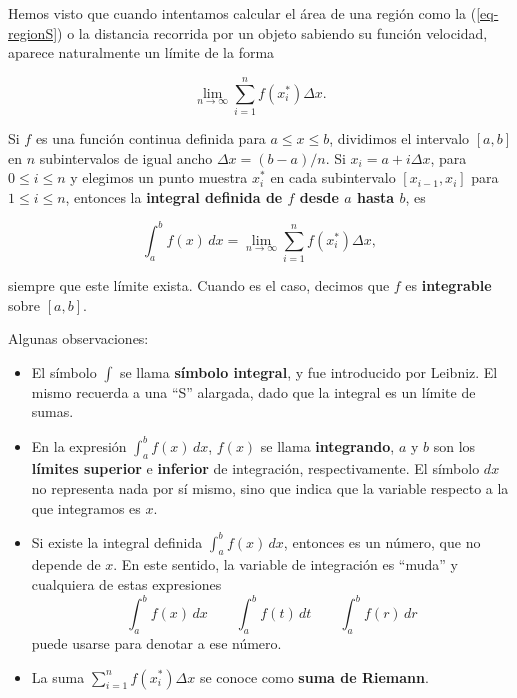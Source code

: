 \documentclass[
  letterpaper,
]{book}
\theoremstyle{plain}
\theoremstyle{remark}
\begin{document}
Hemos visto que cuando intentamos calcular el área de una región como la
(\ref{eq-regionS}) o la distancia recorrida por un objeto sabiendo su
función velocidad, aparece naturalmente un límite de la forma

\[
\lim_{n\to \infty} \sum_{i=1}^{n} f(x_i^*)\Delta x.
\]

\begin{tcolorbox}[enhanced jigsaw, opacityback=0, left=2mm, opacitybacktitle=0.6, toprule=.15mm, bottomrule=.15mm, colbacktitle=quarto-callout-note-color!10!white, titlerule=0mm, bottomtitle=1mm, title=\textcolor{quarto-callout-note-color}{\faInfo}\hspace{0.5em}{Definición (Integral definida)}, toptitle=1mm, colframe=quarto-callout-note-color-frame, colback=white, breakable, rightrule=.15mm, arc=.35mm, leftrule=.75mm, coltitle=black]

Si \(f\) es una función continua definida para \(a\leq x\leq b\),
dividimos el intervalo \([a,b]\) en \(n\) subintervalos de igual ancho
\(\Delta x=(b-a)/n\). Si \(x_i=a+i\Delta x\), para \(0\leq i\leq n\) y
elegimos un punto muestra \(x_i^*\) en cada subintervalo
\([x_{i-1},x_i]\) para \(1\leq i\leq n\), entonces la \textbf{integral
definida de \(f\) desde \(a\) hasta \(b\)}, es

\[
\int_a^b f(x)\,dx=\lim_{n\to \infty} \sum_{i=1}^n f(x_i^*)\Delta x,
\]

siempre que este límite exista. Cuando es el caso, decimos que \(f\) es
\textbf{integrable} sobre \([a,b]\).

\end{tcolorbox}

Algunas observaciones:

\begin{itemize}
\item
  El símbolo \(\int\) se llama \textbf{símbolo integral}, y fue
  introducido por Leibniz. El mismo recuerda a una ``S'' alargada, dado
  que la integral es un límite de sumas.
\item
  En la expresión \(\displaystyle \int_a^b f(x)\,dx\), \(f(x)\) se llama
  \textbf{integrando}, \(a\) y \(b\) son los \textbf{límites superior} e
  \textbf{inferior} de integración, respectivamente. El símbolo \(dx\)
  no representa nada por sí mismo, sino que indica que la variable
  respecto a la que integramos es \(x\).
\item
  Si existe la integral definida \(\displaystyle \int_a^b f(x)\,dx\),
  entonces es un número, que no depende de \(x\). En este sentido, la
  variable de integración es ``muda'' y cualquiera de estas expresiones
  \[
  \int_a^b f(x)\,dx \qquad \int_a^b f(t)\,dt \qquad \int_a^b f(r)\,dr 
  \] puede usarse para denotar a ese número.
\item
  La suma \(\displaystyle \sum_{i=1}^n f(x_i^*)\Delta x\) se conoce como
  \textbf{suma de Riemann}.
\end{itemize}
\end{document}
